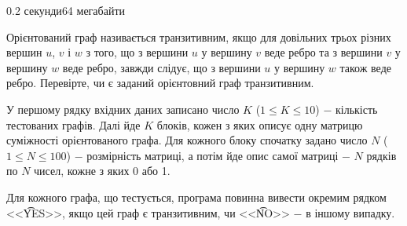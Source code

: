 \begin{problem}{}{}{}{0.2 секунди}{64 мегабайти}

Орієнтований граф називається транзитивним, якщо для довільних трьох різних вершин $u$, $v$ і $w$ з того,
що з вершини $u$ у вершину $v$ веде ребро та з вершини $v$ у вершину $w$ веде ребро, завжди слідує, що з вершини $u$ у вершину $w$ також веде ребро.
Перевірте, чи є заданий орієнтовний граф транзитивним.

\InputFile
У першому рядку вхідних даних записано число $K$ ($1 \le K \le 10$) $-$ кількість тестованих графів.
Далі йде $K$ блоків, кожен з яких описує одну матрицю суміжності орієнтованого графа.
Для кожного блоку спочатку задано число $N$ ($1 \le N \le 100$) $-$ розмірність матриці, а потім йде опис самої матриці $-$ $N$ рядків по $N$ чисел, кожне з яких 0 або 1.

\OutputFile
Для кожного графа, що тестується, програма повинна вивести окремим рядком <<{\t{YES}}>>, якщо цей граф є транзитивним, чи <<{\t{NO}}>> $-$ в іншому випадку.

\Example

\begin{example}
%
\end{example}

\end{problem}
